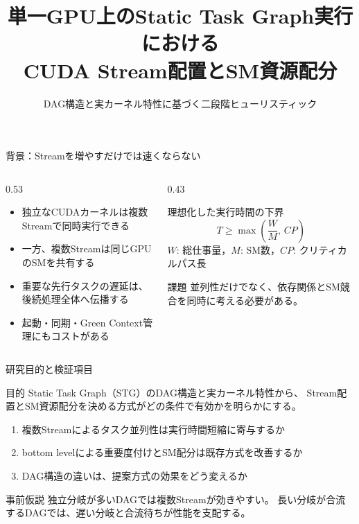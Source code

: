 \documentclass[aspectratio=169,10pt]{beamer}
\title[CUDA Stream配置とSM資源配分]{単一GPU上のStatic Task Graph実行における\\CUDA Stream配置とSM資源配分}
\subtitle{DAG構造と実カーネル特性に基づく二段階ヒューリスティック}
\author{}
\institute{}
\date{}
\begin{document}
\begin{frame}
  \titlepage
\end{frame}

\begin{frame}{背景：Streamを増やすだけでは速くならない}
  \begin{columns}[T,onlytextwidth]
    \begin{column}{0.53\textwidth}
      \begin{itemize}
        \item 独立なCUDAカーネルは複数Streamで同時実行できる
        \item 一方、複数Streamは同じGPUのSMを共有する
        \item 重要な先行タスクの遅延は、後続処理全体へ伝播する
        \item 起動・同期・Green Context管理にもコストがある
      \end{itemize}
    \end{column}
    \begin{column}{0.43\textwidth}
      \begin{block}{理想化した実行時間の下界}
        \[
          T \geq \max\!\left(\frac{W}{M},\,CP\right)
        \]
        \small
        $W$: 総仕事量，$M$: SM数，$CP$: クリティカルパス長
      \end{block}
      \begin{alertblock}{課題}
        並列性だけでなく、依存関係とSM競合を同時に考える必要がある。
      \end{alertblock}
    \end{column}
  \end{columns}
\end{frame}

\begin{frame}{研究目的と検証項目}
  \begin{block}{目的}
    Static Task Graph（STG）のDAG構造と実カーネル特性から、
    Stream配置とSM資源配分を決める方式が\alert{どの条件で有効か}を明らかにする。
  \end{block}
  \begin{enumerate}
    \item 複数Streamによるタスク並列性は実行時間短縮に寄与するか
    \item bottom levelによる重要度付けとSM配分は既存方式を改善するか
    \item DAG構造の違いは、提案方式の効果をどう変えるか
  \end{enumerate}
  \vspace{2mm}
  \begin{exampleblock}{事前仮説}
    独立分岐が多いDAGでは複数Streamが効きやすい。
    長い分岐が合流するDAGでは、遅い分岐と合流待ちが性能を支配する。
  \end{exampleblock}
\end{frame}
\end{document}
